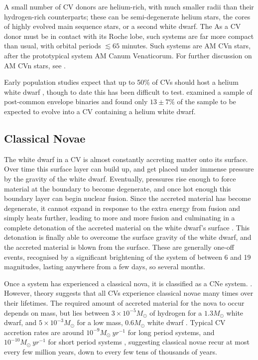 A small number of CV donors are helium-rich, with much smaller radii than their hydrogen-rich counterparts; these can be semi-degenerate helium stars, the cores of highly evolved main sequence stars, or a second white dwarf. The  As a CV donor must be in contact with its Roche lobe, such systems are far more compact than usual, with orbital periods $\lesssim 65$ minutes. Such systems are AM CVn stars, after the prototypical system AM Canum Venaticorum. For further discussion on AM CVn stars, see \citep{solheim2010}.

Early population studies expect that up to 50\% of CVs should host a helium white dwarf \citep{politano1996}, though to date this has been difficult to test. \citet{zorotovic2010} examined a sample of post-common envelope binaries and found only $13\pm7\%$ of the sample to be expected to evolve into a CV containing a helium white dwarf.


\subsection{Classical Novae}
\label{sect:introduction:classical novae}

The white dwarf in a CV is almost constantly accreting matter onto its surface. Over time this surface layer can build up, and get placed under immense pressure by the gravity of the white dwarf. Eventually, pressures rise enough to force material at the boundary to become degenerate, and once hot enough this boundary layer can begin nuclear fusion. 
Since the accreted material has become degenerate, it cannot expand in response to the extra energy from fusion and simply heats further, leading to more and more fusion and culminating in a complete detonation of the accreted material on the white dwarf's surface \citep{warner1995}. This detonation is finally able to overcome the surface gravity of the white dwarf, and the accreted material is blown from the surface.
These are generally one-off events, recognised by a significant brightening of the system of between 6 and 19 magnitudes, lasting anywhere from a few days, so several months. 

Once a system has experienced a classical nova, it is classified as a CNe system. \citep{warner1995}. However, theory suggests that all CVs experience classical novae many times over their lifetimes. The required amount of accreted material for the nova to occur depends on mass, but lies between $3\times10^{-5} M_\odot$ of hydrogen for a $1.3 M_\odot$ white dwarf, and $5\times10^{-3} M_\odot$ for a low mass, $0.6 M_\odot$ white dwarf \citep{hellier2001}. Typical CV accretion rates are around $10^{-9} M_\odot\ yr^{-1}$ for long period systems, and $10^{-10} M_\odot\ yr^{-1}$ for short period systems \citep{hellier2001, Pala2021}, suggesting classical novae recur at most every few million years, down to every few tens of thousands of years.

